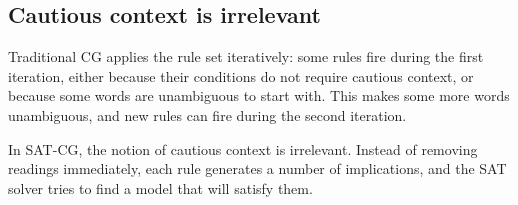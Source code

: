 



\subsection{Cautious context is irrelevant}

Traditional CG applies the rule set iteratively:
some rules fire during the first iteration, either because their
conditions do not require cautious context, or because some words are
unambiguous to start with. This makes some more words unambiguous, and
new rules can fire during the second iteration.

In SAT-CG, the notion of cautious context is irrelevant. Instead of
removing readings immediately,  each rule generates a  number of
implications, and the SAT solver tries to find a model that will satisfy them. 


